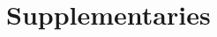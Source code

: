 \documentclass{article}
\begin{document}
 
\setlength{\abovedisplayskip}{5.5pt}
\setlength{\belowdisplayskip}{6pt}
\onecolumn

\appendix
\section*{Supplementaries}
\renewcommand{\thesubsection}{\Alph{subsection}}















\end{document}

